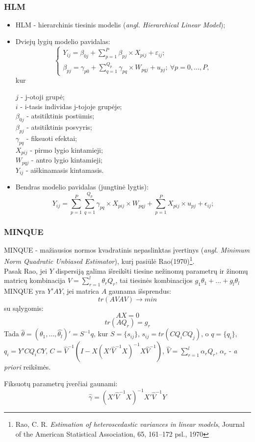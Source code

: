 \documentclass[utf8,hyperref={unicode,pdftex}]{beamer}
\begin{document}
\begin{frame}
\frametitle{HLM}
\begin{itemize}
\item HLM - hierarchinis tiesinis modelis (\textit{angl. Hierarchical Linear Model});
\item Dviejų lygių modelio pavidalas: 
\[ \left\{
  \begin{array}{l}
    Y_{ij} = \beta_{0j}+\sum^P_{p = 1} \beta_{pj}\times X_{pij}+\varepsilon_{ij}; \\
    \beta_{pj} = \gamma_{p0} + \sum^{Q_p}_{q=1}\gamma_{pq}\times W_{pqj}+u_{pj};\ \forall p = 0 , \dots, P,
  \end{array} \right.\]
kur\\
\begin{small}
$j$ - j-otoji grupė;\\
$i$ - i-tasis individas j-tojoje grupėje;\\
$\beta_{0j}$ - atsitiktinis postūmis;\\
$\beta_{pj}$ - atsitiktinis posvyris;\\
$\gamma_{pq}$ - fiksuoti efektai;\\
$X_{pij}$ - pirmo lygio kintamieji;\\
$W_{pqj}$ - antro lygio kintamieji;\\
$Y_{ij}$ - aiškinamasis kintamasis.
\end{small}
\small
\item Bendras modelio pavidalas (jungtinė lygtis):
\[ 
    Y_{ij} =\sum^P_{p = 1} \sum^{Q_p}_{q=1}\gamma_{pq}\times X_{pij}\times W_{pqj}+\sum^P_{p = 1} X_{pij}\times u_{pj}+\epsilon_{ij}; 
 \]
\end{itemize}
\end{frame}
\begin{frame}
\frametitle{MINQUE}
\begin{small}
\indent MINQUE - mažiausios normos kvadratinis nepaslinktas įvertinys (\textit{angl. Minimum Norm Quadratic Unbiased Estimator}), kurį pasiūlė Rao(1970)\footnote{Rao, C. R.  \textit{Estimation of heteroscedastic variances in linear models}, Journal of the American Statistical Association, 65, 161–172 psl., 1970}.\\
 

\indent Pasak Rao, jei $Y$ dispersiją galima išreikšti tiesine nežinomų parametrų ir žinomų matricų kombinacija $V= \sum^l_{r=1}\theta_r Q_r$, tai tiesinės kombinacijos $g_1 \theta_1+\dots+g_l \theta_l$ MINQUE yra $Y'AY$, jei matrica $A$ gaunama išsprendus:
\[tr(AVAV) \to min\]
su sąlygomis:
\[AX = 0\]
\[tr(AQ_r)=g_r\]
Tada $\hat{\theta} = (\hat{\theta_1},\dots,\hat{\theta_l})'=S^{-1}q$, kur $S=\{s_{ij}\}$, $s_{ij}=tr(CQ_iCQ_j)$, o
$q=\{q_i\}$, $q_i=Y'CQ_iCY$, $C = \hat{V}^{-1}(I-X(X' \hat{V}^{-1}X)^{-1}X \hat{V}^{-1})$, $\hat{V}=\sum^l_{r=1}\alpha_rQ_r$, $\alpha_r$ - \textit{a priori} reikšmės.

Fiksuotų parametrų įverčiai gaunami:
\[\hat{\gamma}=(X'\hat{V}^{-1}X)^{-1}X'\hat{V}^{-1}Y\]
\end{small}
\end{frame}
\end{document}
